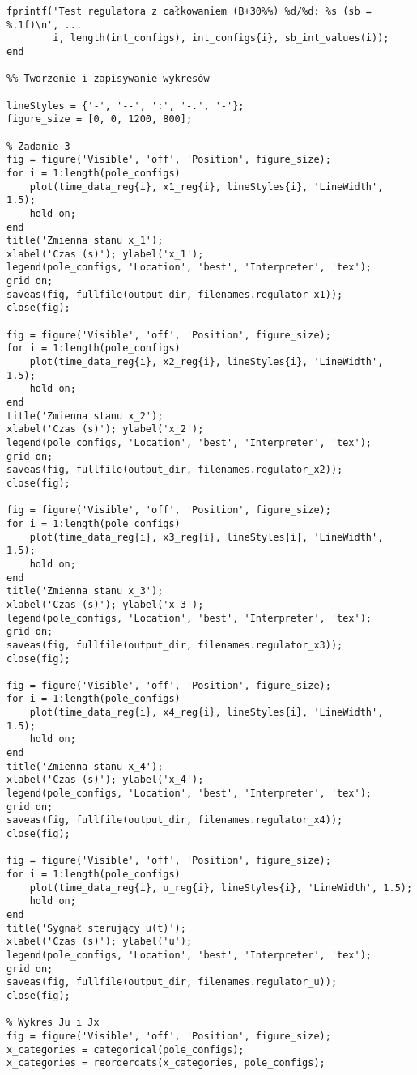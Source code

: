 \documentclass[a4paper,titlepage,11pt,floatssmall]{mwrep} %
\begin{document}
\begin{lstlisting}[style=custommatlab, caption={Pełny kod skryptu \texttt{combined\_plots.m}.}, label={lst:init_full}]
    fprintf('Test regulatora z całkowaniem (B+30%%) %d/%d: %s (sb = %.1f)\n', ...
        i, length(int_configs), int_configs{i}, sb_int_values(i));
end

%% Tworzenie i zapisywanie wykresów

lineStyles = {'-', '--', ':', '-.', '-'};
figure_size = [0, 0, 1200, 800];

% Zadanie 3
fig = figure('Visible', 'off', 'Position', figure_size);
for i = 1:length(pole_configs)
    plot(time_data_reg{i}, x1_reg{i}, lineStyles{i}, 'LineWidth', 1.5);
    hold on;
end
title('Zmienna stanu x_1');
xlabel('Czas (s)'); ylabel('x_1');
legend(pole_configs, 'Location', 'best', 'Interpreter', 'tex');
grid on;
saveas(fig, fullfile(output_dir, filenames.regulator_x1));
close(fig);

fig = figure('Visible', 'off', 'Position', figure_size);
for i = 1:length(pole_configs)
    plot(time_data_reg{i}, x2_reg{i}, lineStyles{i}, 'LineWidth', 1.5);
    hold on;
end
title('Zmienna stanu x_2');
xlabel('Czas (s)'); ylabel('x_2');
legend(pole_configs, 'Location', 'best', 'Interpreter', 'tex');
grid on;
saveas(fig, fullfile(output_dir, filenames.regulator_x2));
close(fig);

fig = figure('Visible', 'off', 'Position', figure_size);
for i = 1:length(pole_configs)
    plot(time_data_reg{i}, x3_reg{i}, lineStyles{i}, 'LineWidth', 1.5);
    hold on;
end
title('Zmienna stanu x_3');
xlabel('Czas (s)'); ylabel('x_3');
legend(pole_configs, 'Location', 'best', 'Interpreter', 'tex');
grid on;
saveas(fig, fullfile(output_dir, filenames.regulator_x3));
close(fig);

fig = figure('Visible', 'off', 'Position', figure_size);
for i = 1:length(pole_configs)
    plot(time_data_reg{i}, x4_reg{i}, lineStyles{i}, 'LineWidth', 1.5);
    hold on;
end
title('Zmienna stanu x_4');
xlabel('Czas (s)'); ylabel('x_4');
legend(pole_configs, 'Location', 'best', 'Interpreter', 'tex');
grid on;
saveas(fig, fullfile(output_dir, filenames.regulator_x4));
close(fig);

fig = figure('Visible', 'off', 'Position', figure_size);
for i = 1:length(pole_configs)
    plot(time_data_reg{i}, u_reg{i}, lineStyles{i}, 'LineWidth', 1.5);
    hold on;
end
title('Sygnał sterujący u(t)');
xlabel('Czas (s)'); ylabel('u');
legend(pole_configs, 'Location', 'best', 'Interpreter', 'tex');
grid on;
saveas(fig, fullfile(output_dir, filenames.regulator_u));
close(fig);

% Wykres Ju i Jx
fig = figure('Visible', 'off', 'Position', figure_size);
x_categories = categorical(pole_configs);
x_categories = reordercats(x_categories, pole_configs);


\end{lstlisting}
\end{document}
